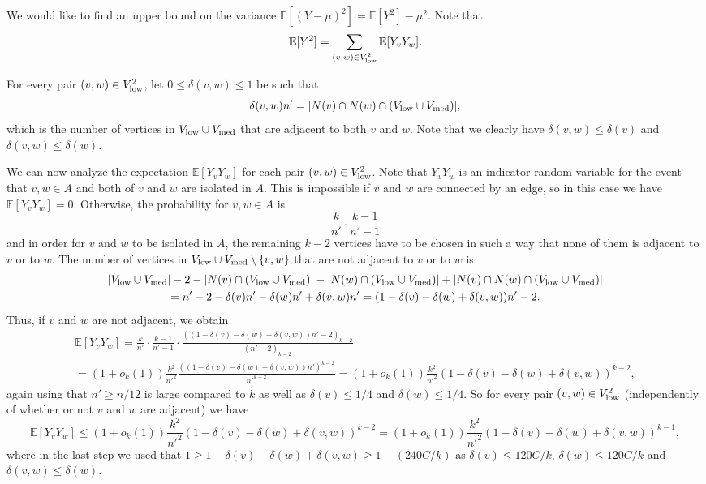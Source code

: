 We would like to find an upper bound on the variance $\mathbb{E}[(Y-\mu)^2]=\mathbb{E}[Y^2]-\mu^2$. Note that
\[\mathbb{E}[Y^2]=\sum_{(v,w)\in V_{\textnormal{low}}^2}\mathbb{E}[Y_vY_w].\]

For every pair $(v,w)\in V_{\textnormal{low}}^2$, let $0\leq \delta(v,w)\leq 1$ be such that
\[\delta(v,w)n'=\vert N(v)\cap N(w)\cap (V_{\textnormal{low}}\cup V_{\textnormal{med}})\vert,\]
which is the number of vertices in $V_{\textnormal{low}}\cup V_{\textnormal{med}}$ that are adjacent to both $v$ and $w$. Note that we clearly have $\delta(v,w)\leq \delta(v)$ and $\delta(v,w)\leq \delta(w)$.

We can now analyze the expectation $\mathbb{E}[Y_vY_w]$ for each pair $(v,w)\in V_{\textnormal{low}}^2$. Note that $Y_vY_w$ is an indicator random variable for the event that $v,w\in A$ and both of $v$ and $w$ are isolated in $A$. This is impossible if $v$ and $w$ are connected by an edge, so in this case we have $\mathbb{E}[Y_vY_w]=0$. Otherwise, the probability for $v,w\in A$ is
\[\frac{k}{n'}\cdot \frac{k-1}{n'-1}\]
and in order for $v$ and $w$ to be isolated in $A$, the remaining $k-2$ vertices have to be chosen in such a way that none of them is adjacent to $v$ or to $w$. The number of vertices in $V_{\textnormal{low}}\cup V_{\textnormal{med}}\setminus \lbrace v,w\rbrace$ that are not adjacent to $v$ or to $w$ is
\begin{multline*}
\vert V_{\textnormal{low}}\cup V_{\textnormal{med}}\vert-2-\vert N(v)\cap (V_{\textnormal{low}}\cup V_{\textnormal{med}})\vert-\vert N(w)\cap (V_{\textnormal{low}}\cup V_{\textnormal{med}})\vert+\vert N(v)\cap N(w)\cap (V_{\textnormal{low}}\cup V_{\textnormal{med}})\vert\\
=n'-2-\delta(v)n'-\delta(w)n'+\delta(v,w)n'=(1-\delta(v)-\delta(w)+\delta(v,w))n'-2.
\end{multline*}
Thus, if $v$ and $w$ are not adjacent, we obtain
\begin{multline*}
\mathbb{E}[Y_vY_w]=\frac{k}{n'}\cdot \frac{k-1}{n'-1}\cdot \frac{((1-\delta(v)-\delta(w)+\delta(v,w))n'-2)_{k-2}}{(n'-2)_{k-2}}\\
=(1+o_k(1)) \frac{k^2}{n'^2}\frac{((1-\delta(v)-\delta(w)+\delta(v,w))n')^{k-2}}{n'^{k-2}}=(1+o_k(1)) \frac{k^2}{n'^2}(1-\delta(v)-\delta(w)+\delta(v,w))^{k-2},
\end{multline*}
again using that $n'\geq n/12$ is large compared to $k$ as well as $\delta(v)\leq 1/4$ and $\delta(w)\leq 1/4$. So for every pair $(v,w)\in V_{\textnormal{low}}^2$ (independently of whether or not $v$ and $w$ are adjacent) we have
\[\mathbb{E}[Y_vY_w]\leq (1+o_k(1))\frac{k^2}{n'^2}(1-\delta(v)-\delta(w)+\delta(v,w))^{k-2}=(1+o_k(1))\frac{k^2}{n'^2}(1-\delta(v)-\delta(w)+\delta(v,w))^{k-1},\]
where in the last step we used that $1\geq 1-\delta(v)-\delta(w)+\delta(v,w)\geq 1-(240C/k)$ as $\delta(v)\leq 120C/k$, $\delta(w)\leq 120C/k$ and $\delta(v,w)\leq \delta(w)$.

